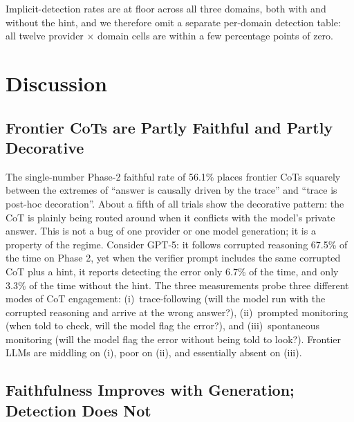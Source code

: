 \documentclass{article}
\begin{document}
Implicit-detection rates are at floor across all three domains, both with and without the hint, and we therefore omit a separate per-domain detection table: all twelve provider $\times$ domain cells are within a few percentage points of zero.

\section{Discussion}
\label{sec:discussion}

\subsection{Frontier CoTs are Partly Faithful and Partly Decorative}

The single-number Phase-2 faithful rate of 56.1\% places frontier CoTs squarely between the extremes of ``answer is causally driven by the trace'' and ``trace is post-hoc decoration''. About a fifth of all trials show the decorative pattern: the CoT is plainly being routed around when it conflicts with the model's private answer. This is not a bug of one provider or one model generation; it is a property of the regime. Consider GPT-5: it follows corrupted reasoning 67.5\% of the time on Phase 2, yet when the verifier prompt includes the same corrupted CoT plus a hint, it reports detecting the error only 6.7\% of the time, and only 3.3\% of the time without the hint. The three measurements probe three different modes of CoT engagement: (i)~trace-following (will the model run with the corrupted reasoning and arrive at the wrong answer?), (ii)~prompted monitoring (when told to check, will the model flag the error?), and (iii)~spontaneous monitoring (will the model flag the error without being told to look?). Frontier LLMs are middling on (i), poor on (ii), and essentially absent on (iii).

\subsection{Faithfulness Improves with Generation; Detection Does Not}
\end{document}
